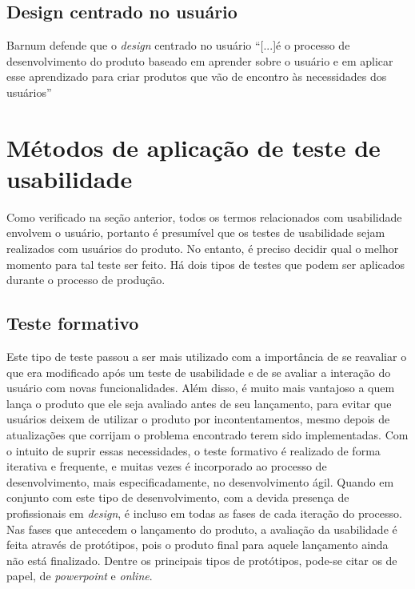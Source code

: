 \subsection{Design centrado no usuário}
\label{sec:dcu}
	Barnum\cite{barnum:01} defende que o \emph{design} centrado no usuário “[...]é o processo de desenvolvimento do produto baseado em aprender sobre o usuário e em aplicar esse aprendizado para criar produtos que vão de encontro às necessidades dos usuários”  


\section{Métodos de aplicação de teste de usabilidade}
\label{sec:metodos-aplicacao}
    Como verificado na seção anterior, todos os termos relacionados com usabilidade envolvem o usuário, portanto é presumível que os testes de usabilidade sejam realizados com usuários do produto. No entanto, é preciso decidir qual o melhor momento para tal teste ser feito. Há dois tipos de testes que podem ser aplicados durante o processo de produção.

\subsection{Teste formativo}
\label{sec:teste-formativo}
    Este tipo de teste passou a ser mais utilizado com a importância de se reavaliar o que era modificado após um teste de usabilidade e de se avaliar a interação do usuário com novas funcionalidades. Além disso, é muito mais vantajoso a quem lança o produto que ele seja avaliado antes de seu lançamento, para evitar que usuários deixem de utilizar o produto por incontentamentos, mesmo depois de atualizações que corrijam o problema encontrado terem sido implementadas. 
    Com o intuito de suprir essas necessidades, o teste formativo é realizado de forma iterativa e frequente, e muitas vezes é incorporado ao processo de desenvolvimento, mais especificadamente, no desenvolvimento ágil. Quando em conjunto com este tipo de desenvolvimento, com a devida presença de profissionais em \emph{design}, é incluso em todas as fases de cada iteração do processo.
    Nas fases que antecedem o lançamento do produto, a avaliação da usabilidade é feita através de protótipos, pois o produto final para aquele lançamento ainda não está finalizado. Dentre os principais tipos de protótipos, pode-se citar os de papel, de \emph{powerpoint} e \emph{online}. 
    
